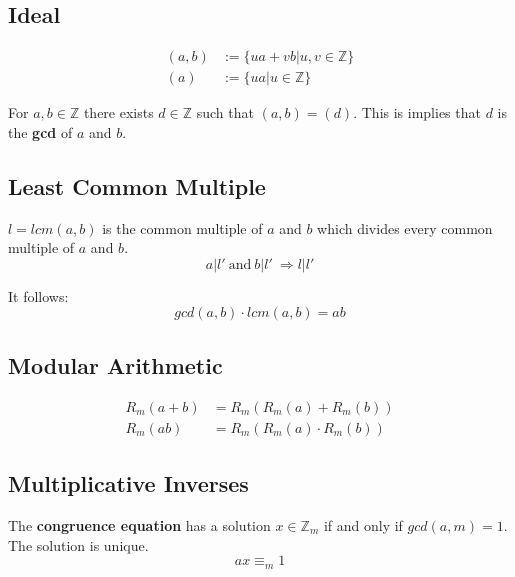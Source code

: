\documentclass[11pt]{article}
\begin{document}
\subsection{Ideal}

\begin{equation*}
\begin{split}
	(a,b) & := \{ua + vb | u,v \in \mathbb{Z}\} \\
	(a) & := \{ua | u \in \mathbb{Z}\}
\end{split}
\end{equation*}

For $a,b \in \mathbb{Z}$ there exists $d \in \mathbb{Z}$ such that $(a,b) = (d)$. This is implies that $d$ is the \textbf{gcd} of $a$ and $b$.

\subsection{Least Common Multiple}

$l = lcm(a,b)$ is the common multiple of $a$ and $b$ which divides every common multiple of $a$ and $b$.
\begin{equation*}
	a|l'\ \text{and}\ b|l'\ \Rightarrow l|l'
\end{equation*}

It follows:
\begin{equation*}
	gcd(a,b) \cdot lcm(a,b) = ab
\end{equation*}

\subsection{Modular Arithmetic}

\begin{equation*}
\begin{split}
	R_m(a + b) & = R_m(R_m(a) + R_m(b)) \\
	R_m(ab) & = R_m(R_m(a) \cdot R_m(b))
\end{split}
\end{equation*}

\subsection{Multiplicative Inverses}

The \textbf{congruence equation} has a solution $x \in \mathbb{Z}_m$ if and only if $gcd(a, m) =1$. The solution is unique.
\begin{equation*}
	ax \equiv_m 1
\end{equation*}
\end{document}
